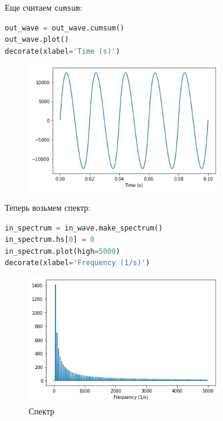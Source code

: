 \documentclass[a4paper,12pt]{report}
\begin{document}
    Еще считаем \texttt{cumsum}:
    
\begin{lstlisting}[language=Python,caption=\textquote{Просуммированный х2}]
out_wave = out_wave.cumsum()
out_wave.plot()
decorate(xlabel='Time (s)')
\end{lstlisting}

    \begin{figure}[H]
        \centering
        \includegraphics[width=0.75\textwidth]{ex3_in_wave_more.png}
        \caption{}
        \label{fig:ex3_in_wave_more}
    \end{figure}

    Теперь возьмем спектр:
    
\begin{lstlisting}[language=Python,caption=Спектр]
in_spectrum = in_wave.make_spectrum()
in_spectrum.hs[0] = 0
in_spectrum.plot(high=5000)
decorate(xlabel='Frequency (1/s)')
\end{lstlisting}

    \begin{figure}[H]
        \centering
        \includegraphics[width=0.75\textwidth]{ex3_in_spectrum.png}
        \caption{Спектр}
        \label{fig:ex3_in_spectrum}
    \end{figure}
\end{document}
